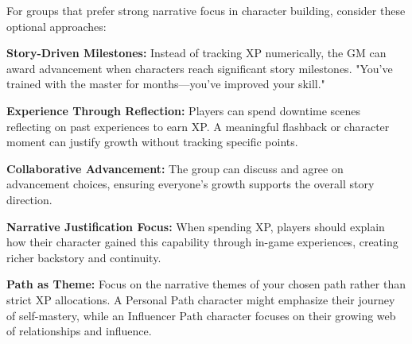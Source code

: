 For groups that prefer strong narrative focus in character building, consider these optional approaches:

\textbf{Story-Driven Milestones:} Instead of tracking XP numerically, the GM can award advancement when characters reach significant story milestones. "You've trained with the master for months—you've improved your skill."

\textbf{Experience Through Reflection:} Players can spend downtime scenes reflecting on past experiences to earn XP. A meaningful flashback or character moment can justify growth without tracking specific points.

\textbf{Collaborative Advancement:} The group can discuss and agree on advancement choices, ensuring everyone's growth supports the overall story direction.

\textbf{Narrative Justification Focus:} When spending XP, players should explain how their character gained this capability through in-game experiences, creating richer backstory and continuity.

\textbf{Path as Theme:} Focus on the narrative themes of your chosen path rather than strict XP allocations. A Personal Path character might emphasize their journey of self-mastery, while an Influencer Path character focuses on their growing web of relationships and influence.